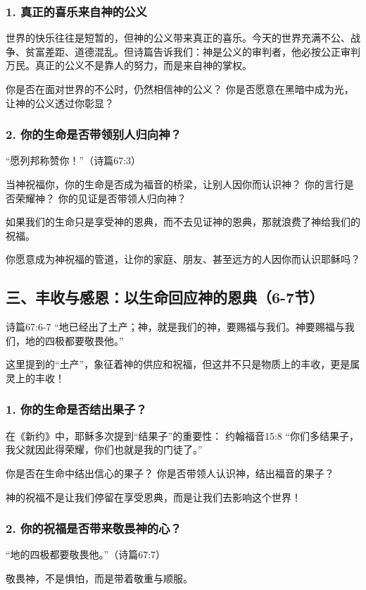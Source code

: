 \documentclass[a4paper, 12pt]{article}
\begin{document}
\subsubsection*{1. 真正的喜乐来自神的公义}
\hspace{0.6cm}世界的快乐往往是短暂的，但神的公义带来真正的喜乐。今天的世界充满不公、战争、贫富差距、道德混乱。但诗篇告诉我们：神是公义的审判者，他必按公正审判万民。真正的公义不是靠人的努力，而是来自神的掌权。

你是否在面对世界的不公时，仍然相信神的公义？
你是否愿意在黑暗中成为光，让神的公义透过你彰显？
\subsubsection*{2. 你的生命是否带领别人归向神？}
“愿列邦称赞你！”（诗篇67:3）

当神祝福你，你的生命是否成为福音的桥梁，让别人因你而认识神？
你的言行是否荣耀神？
你的见证是否带领人归向神？

如果我们的生命只是享受神的恩典，而不去见证神的恩典，那就浪费了神给我们的祝福。

你愿意成为神祝福的管道，让你的家庭、朋友、甚至远方的人因你而认识耶稣吗？

\subsection*{三、丰收与感恩：以生命回应神的恩典（6-7节）}
诗篇67:6-7 “地已经出了土产；神，就是我们的神，要赐福与我们。神要赐福与我们，地的四极都要敬畏他。”

这里提到的“土产”，象征着神的供应和祝福，但这并不只是物质上的丰收，更是属灵上的丰收！
\subsubsection*{1. 你的生命是否结出果子？}
\hspace{0.6cm}在《新约》中，耶稣多次提到“结果子”的重要性：
约翰福音15:8 “你们多结果子，我父就因此得荣耀，你们也就是我的门徒了。”

你是否在生命中结出信心的果子？
你是否带领人认识神，结出福音的果子？

神的祝福不是让我们停留在享受恩典，而是让我们去影响这个世界！
\subsubsection*{2. 你的祝福是否带来敬畏神的心？}
“地的四极都要敬畏他。”（诗篇67:7）

敬畏神，不是惧怕，而是带着敬重与顺服。
\end{document}
